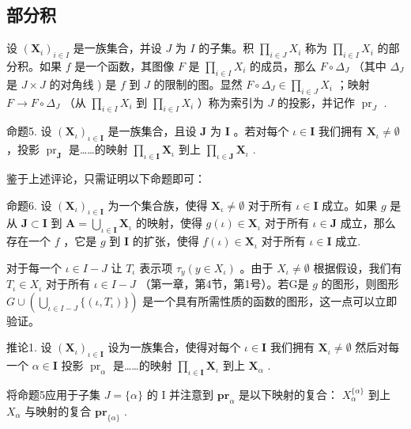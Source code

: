 \subsection{部分积}

设 \((\mathbf{X}_i)_{i\in I}\) 是一族集合，并设 \(J\) 为 \(I\) 的子集。积 \(\prod_{i\in J} X_i\) 称为 \(\prod_{i\in I} X_i\) 的部分积。如果 \(f\) 是一个函数，其图像 \(F\) 是 \(\prod_{i\in I} X_i\) 的成员，那么 \(F \circ \Delta_J\) （其中 \(\Delta_J\) 是 \(J \times J\) 的对角线 ) 是 \(f\) 到 \(J\) 的限制的图。显然 \(F \circ \Delta_J \in \prod_{i\in J} X_i\) ；映射 \(F \to F \circ \Delta_J\) （从 \(\prod_{i\in I} X_i\) 到 \(\prod_{i\in I} X_i\) ）称为索引为 \(J\) 的投影，并记作 \(\operatorname{pr}_J\) .

命题5. 设 \((\mathbf{X}_{\iota})_{\iota \in \mathbf{I}}\) 是一族集合，且设 \(\mathbf{J}\) 为 \(\mathbf{I}\) 。若对每个 \(\iota \in \mathbf{I}\) 我们拥有 \(\mathbf{X}_{\iota} \neq \emptyset\) ，投影 \(\operatorname{pr}_{\mathbf{J}}\) 是……的映射 \(\prod_{\iota \in \mathbf{I}} \mathbf{X}_{\iota}\) 到上 \(\prod_{\iota \in \mathbf{J}} \mathbf{X}_{\iota}\) .

鉴于上述评论，只需证明以下命题即可：

命题6. 设 \((\mathbf{X}_{\iota})_{\iota \in \mathbf{I}}\) 为一个集合族，使得 \(\mathbf{X}_{\iota} \neq \emptyset\) 对于所有 \(\iota \in \mathbf{I}\) 成立。如果 \(g\) 是从 \(\mathbf{J} \subset \mathbf{I}\) 到 \(\mathbf{A} = \bigcup_{\iota \in \mathbf{I}} \mathbf{X}_{\iota}\) 的映射，使得 \(g(\iota) \in \mathbf{X}_{\iota}\) 对于所有 \(\iota \in \mathbf{J}\) 成立，那么存在一个 \(f\) ，它是 \(g\) 到 \(\mathbf{I}\) 的扩张，使得 \(f(\iota) \in \mathbf{X}_{\iota}\) 对于所有 \(\iota \in \mathbf{I}\) 成立.

对于每一个 \(\iota\in I-J\) 让 \(T_{\iota}\) 表示项 \(\tau_{y}(y\in X_{\iota})\) 。由于 \(X_{\iota}\neq\emptyset\) 根据假设，我们有 \(T_{\iota}\in X_{\iota}\) 对于所有 \(\iota\in I-J\) （第一章，第4节，第1号）。若G是 \(g\) 的图形，则图形 \(G\cup\left(\bigcup_{\iota\in I-J}\{(\iota,T_{\iota})\}\right)\) 是一个具有所需性质的函数的图形，这一点可以立即验证。

推论1. 设 \((\mathbf{X}_{\iota})_{\iota \in \mathbf{I}}\) 设为一族集合，使得对每个 \(\iota \in \mathbf{I}\) 我们拥有 \(\mathbf{X}_{\iota} \neq \emptyset\) 然后对每一个 \(\alpha \in \mathbf{I}\) 投影 \(\operatorname{pr}_{\alpha}\) 是……的映射 \(\prod_{\iota \in \mathbf{I}} \mathbf{X}_{\iota}\) 到上 \(\mathbf{X}_{\alpha}\) .

将命题5应用于子集 \(J = \{\alpha\}\) 的 I 并注意到 \(\mathbf{pr}_{\alpha}\) 是以下映射的复合： \(X_{\alpha}^{\{\alpha\}}\) 到上 \(X_{\alpha}\) 与映射的复合 \(\mathbf{pr}_{\{\alpha\}}\) .

